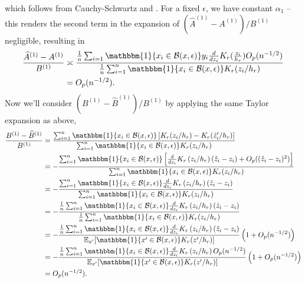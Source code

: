 \documentclass[11pt]{article}
\begin{document}
which follows from Cauchy-Schwartz and . For a fixed $\epsilon$, we have constant $\alpha_1$ -- this renders the second term in the expansion of $(\widehat{A}^{(1)} - A^{(1)})/B^{(1)}$ negligible, resulting in 
\begin{align}
    \frac{\widehat{A}^{(1)} - A^{(1)}}{B^{(1)}} &\asymp \frac{\frac{1}{n}\sum_{i = 1}\mathbbm{1}\{x_i \in \mathcal{B}(x, \epsilon)\}y_i\frac{d}{dz_i}K_r(\frac{z_i}{h_r})O_p(n^{-1/2})}{\frac{1}{n}\sum_{i = 1}^n\mathbbm{1}\{x_i \in \mathcal{B}(x, \epsilon)\}K_r(z_i/h_r)} \\
    &= O_p(n^{-1/2}).
\end{align}
Now we'll consider $(B^{(1)} - \widehat{B}^{(1)})/B^{(1)}$ by applying the same Taylor expansion as above,
\begin{align}
    \frac{B^{(1)} - \widehat{B}^{(1)}}{B^{(1)}} &= \frac{\sum_{i = 1}^n\mathbbm{1}\{x_i \in \mathcal{B}(x, \epsilon)\}\left[K_r(z_i/h_r) - K_r(\hat{z}_i'/h_r)\right]
    }{\sum_{i = 1}^n\mathbbm{1}\{x_i \in \mathcal{B}(x, \epsilon)\}K_r(z_i/h_r)} \\
    &= -\frac{\sum_{i = 1}^n\mathbbm{1}\{x_i \in \mathcal{B}(x, \epsilon)\}\left[\frac{d}{dz_i}K_r\left(z_i/h_r\right)(\hat{z}_i - z_i) + O_p((\hat{z}_i - z_i)^2)\right]
    }{\sum_{i = 1}^n\mathbbm{1}\{x_i \in \mathcal{B}(x, \epsilon)\}K_r(z_i/h_r)} \\
    &\asymp -\frac{\sum_{i = 1}^n\mathbbm{1}\{x_i \in \mathcal{B}(x, \epsilon)\}\frac{d}{dz_i}K_r\left(z_i/h_r\right)(\hat{z}_i - z_i)
    }{\sum_{i = 1}^n\mathbbm{1}\{x_i \in \mathcal{B}(x, \epsilon)\}K_r(z_i/h_r)} \\
    &= -\frac{\frac{1}{n}\sum_{i = 1}^n\mathbbm{1}\{x_i \in \mathcal{B}(x, \epsilon)\}\frac{d}{dz_i}K_r\left(z_i/h_r\right)(\hat{z}_i - z_i)
    }{\frac{1}{n}\sum_{i = 1}^n\mathbbm{1}\{x_i \in \mathcal{B}(x, \epsilon)\}K_r(z_i/h_r)} \\
    &= -\frac{\frac{1}{n}\sum_{i = 1}^n\mathbbm{1}\{x_i \in \mathcal{B}(x, \epsilon)\}\frac{d}{dz_i}K_r\left(z_i/h_r\right)(\hat{z}_i - z_i)
    }{\mathbb{E}_{x'}[\mathbbm{1}\{x' \in \mathcal{B}(x, \epsilon)\}K_r(z'/h_r)]}\left(1 + O_p(n^{-1/2})\right) \\
    &=  -\frac{\frac{1}{n}\sum_{i = 1}^n\mathbbm{1}\{x_i \in \mathcal{B}(x, \epsilon)\}\frac{d}{dz_i}K_r\left(z_i/h_r\right)O_p(n^{-1/2})
    }{\mathbb{E}_{x'}[\mathbbm{1}\{x' \in \mathcal{B}(x, \epsilon)\}K_r(z'/h_r)]}\left(1 + O_p(n^{-1/2})\right) \\
    &= O_p(n^{-1/2}).
\end{align}
\end{document}
